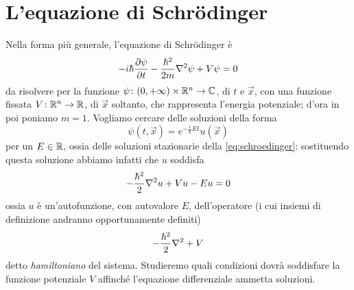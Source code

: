 \chapter{L'equazione di Schrödinger}
\label{ch:schroedinger}

Nella forma più generale, l'equazione di Schrödinger è
\begin{equation}
    -i\hbar\frac{\partial {\psi}}{\partial {t}}-\frac{\hbar^2}{2m}\nabla^2\psi+V\psi=0
    \label{eq:schroedinger}
\end{equation}
da risolvere per la funzione $\psi\colon(0,+\infty)\times\mathbb{R}^n\to\mathbb{C}$, di $t$ e $\vec x$, con una funzione fissata $V\colon\mathbb{R}^n\to\mathbb{R}$, di $\vec x$ soltanto, che rappresenta l'energia potenziale; d'ora in poi poniamo $m=1$.
Vogliamo cercare delle soluzioni della forma
\begin{equation}
    \psi(t,\vec x)=e^{-\frac{i}{\hbar}Et}u(\vec x)
    \label{eq:soluzione-stazionaria-schroedinger}
\end{equation}
per un $E\in\mathbb{R}$, ossia delle soluzioni stazionarie della \eqref{eq:schroedinger}: sostituendo questa soluzione abbiamo infatti che $u$ soddisfa
\begin{equation}
    -\frac{\hbar^2}{2}\nabla^2 u+Vu-Eu=0
    \label{eq:schroedinger-stazionaria}
\end{equation}
ossia $u$ è un'autofunzione, con autovalore $E$, dell'operatore (i cui insiemi di definizione andranno opportunamente definiti)
\begin{equation}
    -\frac{\hbar^2}{2}\nabla^2+V
    \label{eq:operatore-hamiltoniano}
\end{equation}
detto \emph{hamiltoniano} del sistema.
Studieremo quali condizioni dovrà soddisfare la funzione potenziale $V$ affinch\'e l'equazione differenziale ammetta soluzioni.


